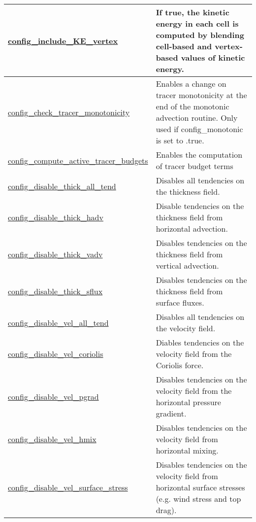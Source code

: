 {\begin{center}
\begin{longtable}{| p{2.0in} || p{4.0in} |}
    \hline
    \hyperref[subsec:nm_sec_config_include_KE_vertex]{config\_include\_KE\_vertex} & If true, the kinetic energy in each cell is computed by blending cell-based and vertex-based values of kinetic energy. \\
    \hline
    \hyperref[subsec:nm_sec_config_check_tracer_monotonicity]{config\_check\_tracer\_\-monotonicity} & Enables a change on tracer monotonicity at the end of the monotonic advection routine. Only used if config\_monotonic is set to .true. \\
    \hline
    \hyperref[subsec:nm_sec_config_compute_active_tracer_budgets]{config\_compute\_active\_tracer\_\-budgets} & Enables the computation of tracer budget terms \\
    \hline
    \hyperref[subsec:nm_sec_config_disable_thick_all_tend]{config\_disable\_thick\_all\_tend} & Disables all tendencies on the thickness field. \\
    \hline
    \hyperref[subsec:nm_sec_config_disable_thick_hadv]{config\_disable\_thick\_hadv} & Disable tendencies on the thickness field from horizontal advection. \\
    \hline
    \hyperref[subsec:nm_sec_config_disable_thick_vadv]{config\_disable\_thick\_vadv} & Disables tendencies on the thickness field from vertical advection. \\
    \hline
    \hyperref[subsec:nm_sec_config_disable_thick_sflux]{config\_disable\_thick\_sflux} & Disables tendencies on the thickness field from surface fluxes. \\
    \hline
    \hyperref[subsec:nm_sec_config_disable_vel_all_tend]{config\_disable\_vel\_all\_tend} & Disables all tendencies on the velocity field. \\
    \hline
    \hyperref[subsec:nm_sec_config_disable_vel_coriolis]{config\_disable\_vel\_coriolis} & Diables tendencies on the velocity field from the Coriolis force. \\
    \hline
    \hyperref[subsec:nm_sec_config_disable_vel_pgrad]{config\_disable\_vel\_pgrad} & Disables tendencies on the velocity field from the horizontal pressure gradient. \\
    \hline
    \hyperref[subsec:nm_sec_config_disable_vel_hmix]{config\_disable\_vel\_hmix} & Disables tendencies on the velocity field from horizontal mixing. \\
    \hline
    \hyperref[subsec:nm_sec_config_disable_vel_surface_stress]{config\_disable\_vel\_surface\_\-stress} & Disables tendencies on the velocity field from horizontal surface stresses (e.g. wind stress and top drag). \\

\end{longtable}
\end{center}}
